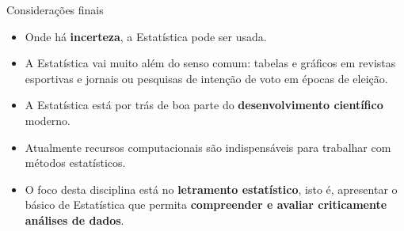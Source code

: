 \documentclass[
  ignorenonframetext,
  serif,
  professionalfont,
  usenames,
  dvipsnames,
  aspectratio = 169]{beamer}
\begin{document}
\begin{frame}{Considerações finais}
\protect\hypertarget{considerauxe7uxf5es-finais}{}
\begin{itemize}
\item
  Onde há \textbf{incerteza}, a Estatística pode ser usada.
\item
  A Estatística vai muito além do senso comum: tabelas e gráficos em
  revistas esportivas e jornais ou pesquisas de intenção de voto em
  épocas de eleição.
\item
  A Estatística está por trás de boa parte do
  \textbf{desenvolvimento científico} moderno.
\item
  Atualmente recursos computacionais são indispensáveis para trabalhar
  com métodos estatísticos.
\item
  O foco desta disciplina está no \textbf{letramento estatístico}, isto
  é, apresentar o básico de Estatística que permita
  \textbf{compreender e avaliar criticamente análises de dados}.
\end{itemize}
\end{frame}
\end{document}
